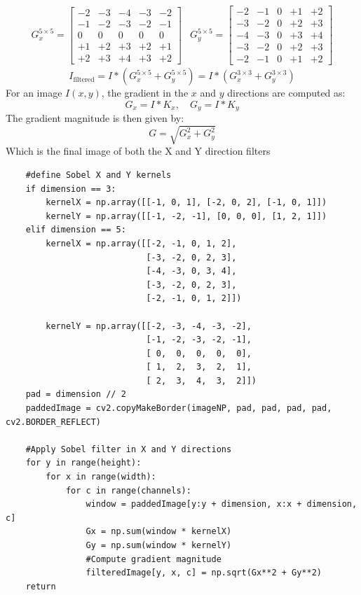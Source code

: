 \begin{equation}
    \begin{array}{cc}
        G_x^{5 \times 5} = 
        \begin{bmatrix}
        -2 & -3 & -4 & -3 & -2 \\
        -1 & -2 & -3 & -2 & -1 \\
        0  & 0  & 0  & 0  & 0  \\
        +1 & +2 & +3 & +2 & +1 \\
        +2 & +3 & +4 & +3 & +2
        \end{bmatrix} 
        &
        G_y^{5 \times 5} = 
        \begin{bmatrix}
        -2 & -1 & 0  & +1 & +2 \\
        -3 & -2 & 0  & +2 & +3 \\
        -4 & -3 & 0  & +3 & +4 \\
        -3 & -2 & 0  & +2 & +3 \\
        -2 & -1 & 0  & +1 & +2
        \end{bmatrix}
    \end{array}
    \label{eq:gx_gy_5x5}
\end{equation}
\begin{equation}
    I_{\text{filtered}} = I * (G_x^{5 \times 5} + G_y^{5 \times 5}) = I * (G_x^{3 \times 3} + G_y^{3 \times 3})
    \label{eq:filtered_image_gx_5x5}
\end{equation}
For an image $I(x, y)$, the gradient in the $x$ and $y$ directions are computed as:
\[
G_x = I * K_x, \quad G_y = I * K_y
\]
The gradient magnitude is then given by:
\[
G = \sqrt{G_x^2 + G_y^2}
\]
Which is the final image of both the X and Y direction filters
\begin{verbatim}
    #define Sobel X and Y kernels
    if dimension == 3:
        kernelX = np.array([[-1, 0, 1], [-2, 0, 2], [-1, 0, 1]])
        kernelY = np.array([[-1, -2, -1], [0, 0, 0], [1, 2, 1]])
    elif dimension == 5:
        kernelX = np.array([[-2, -1, 0, 1, 2],
                            [-3, -2, 0, 2, 3],
                            [-4, -3, 0, 3, 4],
                            [-3, -2, 0, 2, 3],
                            [-2, -1, 0, 1, 2]])
        
        kernelY = np.array([[-2, -3, -4, -3, -2],
                            [-1, -2, -3, -2, -1],
                            [ 0,  0,  0,  0,  0],
                            [ 1,  2,  3,  2,  1],
                            [ 2,  3,  4,  3,  2]])
    pad = dimension // 2
    paddedImage = cv2.copyMakeBorder(imageNP, pad, pad, pad, pad, cv2.BORDER_REFLECT)

    #Apply Sobel filter in X and Y directions
    for y in range(height):
        for x in range(width):
            for c in range(channels):
                window = paddedImage[y:y + dimension, x:x + dimension, c]
                Gx = np.sum(window * kernelX)
                Gy = np.sum(window * kernelY)
                #Compute gradient magnitude
                filteredImage[y, x, c] = np.sqrt(Gx**2 + Gy**2)
    return
\end{verbatim}
